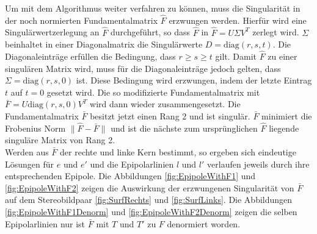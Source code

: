 
Um mit dem Algorithmus weiter verfahren zu können, muss die Singularität in der noch normierten Fundamentalmatrix $\hat{F}$ erzwungen werden\cite{HZ}. Hierfür wird eine Singulärwertzerlegung an $\hat{F}$ durchgeführt, so dass $\hat{F}$ in $\hat{F} = U\Sigma V^T$ zerlegt wird. $\Sigma$ beinhaltet in einer Diagonalmatrix die Singulärwerte $D = \text{diag}(r,s,t)$. Die Diagonaleinträge erfüllen die Bedingung, dass $r \geq s \geq t $ gilt. Damit $\hat{F}$ zu einer singulären Matrix wird, muss für die Diagonaleinträge jedoch gelten, dass  $\Sigma = \text{diag}(r,s,0)$ ist. Diese Bedingung wird erzwungen, indem der letzte Eintrag $t$ auf $t = 0$ gesetzt wird. Die so modifizierte Fundamentalmatrix mit $\bar{F} = U\text{diag}(r,s,0)V^T$ wird dann wieder zusammengesetzt. Die Fundamentalmatrix $\bar{F}$ besitzt jetzt einen Rang 2 und ist singulär\cite{HZ}. $\bar{F}$ minimiert die Frobenius Norm $\parallel \hat{F} -\bar{F} \parallel$ und ist die nächste zum ursprünglichen $\hat{F}$ liegende singuläre Matrix von Rang 2\cite{HZ,HZ8,FormelsammlungMatrizen}. \\

Werden aus $\bar{F}$ der rechte und linke Kern bestimmt, so ergeben sich eindeutige Lösungen für $e$ und $e'$ und die Epipolarlinien $l$ und $l'$ verlaufen jeweils durch ihre entsprechenden Epipole\cite{HZ}. Die Abbildungen \ref{fig:EpipoleWithF1} und \ref{fig:EpipoleWithF2} zeigen die Auswirkung der erzwungenen Singularität von $\bar{F}$ auf dem Stereobildpaar \ref{fig:SurfRechts} und \ref{fig:SurfLinks}. Die Abbildungen \ref{fig:EpipoleWithF1Denorm} und \ref{fig:EpipoleWithF2Denorm} zeigen die selben Epipolarlinien nur ist $\bar{F}$ mit $T$ und $T'$ zu $F$ denormiert worden.\\



% 

